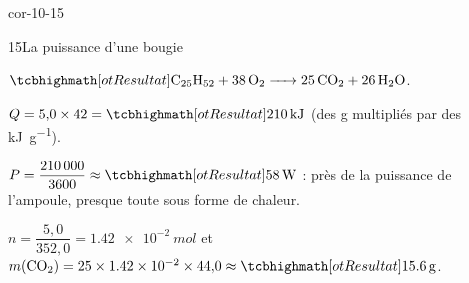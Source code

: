 \begin{blocLivre}{cor-10-15}
\begin{corrige}{15}{La puissance d'une bougie}
\begin{questions}
\item $\res{\ce{C25H52 + 38O2 -> 25CO2 + 26H2O}}$.
\item $Q=5{,}0\times42=\res{\qty{210}{kJ}}$ (des \unit{g} multipliés par des \unit{kJ.g^{-1}}).
\item $P=\dfrac{210\,000}{3600}\approx\res{\qty{58}{W}}$ : près de  la puissance de l'ampoule, presque toute sous forme de chaleur.
\item $n=\dfrac{5{,}0}{352{,}0}=\qty{1,42e-2}{mol}$ et $m(\ce{CO2})=25\times\num{1.42e-2}\times44{,}0\approx\res{\qty{15,6}{g}}$.
\end{questions}
\end{corrige}
\end{blocLivre}
